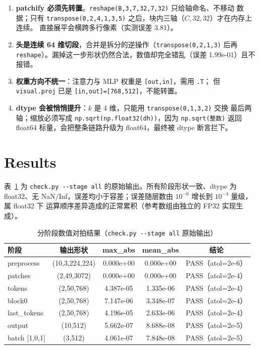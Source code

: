 \documentclass[a4paper,12pt]{article}
\begin{document}
\begin{enumerate}
    \item[陷阱 1] \textbf{patchify 必须先转置}。\texttt{reshape(B,3,7,32,7,32)} 只给轴命名、不移动
          数据；只有 \texttt{transpose(0,2,4,1,3,5)} 之后，块内三轴（$C,32,32$）才在内存上连续。
          直接展平会横跨多行像素（实测误差 3.81）。
    \item[陷阱 2] \textbf{头是连续 64 维切段}，合并是拆分的逆操作（\texttt{transpose(0,2,1,3)} 后再
          \texttt{reshape}）。漏掉这一步形状仍然合法，数值却完全错乱（误差 1.99e-01）且不报错。
    \item[陷阱 3] \textbf{权重方向不统一}：注意力与 MLP 权重是 \texttt{[out,in]}，需用 \texttt{.T}；
          但 \texttt{visual.proj} 已是 \texttt{[in,out]=[768,512]}，不能转置。
    \item[陷阱 4] \textbf{dtype 会被悄悄提升}：$k$ 是 4 维，只能用 \texttt{transpose(0,1,3,2)} 交换
          最后两轴；缩放必须写成 \texttt{np.sqrt(np.float32(dh))}，因为 \texttt{np.sqrt(整数)} 返回
          float64 标量，会把整条链路升级为 float64，最终被 dtype 断言拦下。
\end{enumerate}

\section{Results}

表~\ref{tab:stages} 为 \texttt{check.py -{}-stage all} 的原始输出。所有阶段形状一致、dtype 为
float32、无 NaN/Inf，误差均小于容差；误差随层数由 $10^{-6}$ 增长到 $10^{-4}$ 量级，属 float32 下
运算顺序差异造成的正常累积（参考数组由独立的 FP32 实现生成）。

\begin{table}[H]
\centering
\caption{分阶段数值对拍结果（\texttt{check.py -{}-stage all} 原始输出）}
\label{tab:stages}
\small
\begin{tabular}{lcccc}
\hline
阶段 & 输出形状 & max\_abs & mean\_abs & 结论 \\
\hline
preprocess & (10,3,224,224) & 0.000e+00 & 0.000e+00 & PASS（atol=2e-6） \\
patches & (2,49,3072) & 0.000e+00 & 0.000e+00 & PASS（atol=2e-4） \\
tokens & (2,50,768) & 4.387e-05 & 1.335e-06 & PASS（atol=2e-4） \\
block0 & (2,50,768) & 7.147e-06 & 3.348e-07 & PASS（atol=2e-4） \\
last\_tokens & (2,50,768) & 4.196e-05 & 2.633e-06 & PASS（atol=2e-4） \\
output & (10,512) & 5.662e-07 & 8.688e-08 & PASS（atol=2e-5） \\
batch [1,0,1] & (3,512) & 4.061e-07 & 7.848e-08 & PASS（atol=2e-5） \\
\hline
\end{tabular}
\end{table}
\end{document}
